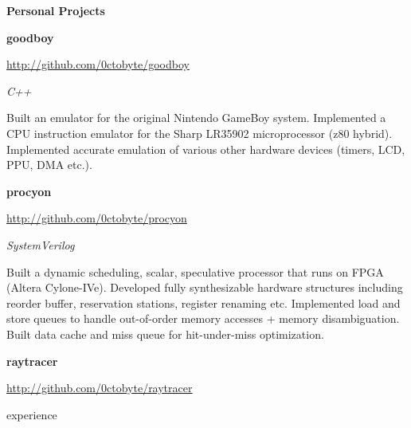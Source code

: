 \documentclass{article}
\newenvironment{name}{\fontfamily{phv}\selectfont\bfseries\normalsize}{\par}
\newenvironment{colorheading}{\fontfamily{phv}\selectfont\bfseries\normalsize\color{darkcyan}}{\par}
\newenvironment{genericbody}{\fontfamily{phv}\selectfont\small\raggedright}{\par}
\newenvironment{metadata}{\fontfamily{phv}\selectfont\itshape\small\color{darkgray}}{\par}
\newenvironment{experience}[2]%
{%
	\begin{minipage}{0.6\linewidth}\begin{flushleft}#1\end{flushleft}\end{minipage}%
	\hfill%
	\begin{minipage}{0.3\linewidth}\begin{flushright}#2\end{flushright}\end{minipage}%
}%
{}
\newcommand{\lineitem}{\item[{$\to$}]}
\newcommand{\dotsep}{\begin{centering}\begin{colorheading}{$\bullet$}\end{colorheading}\end{centering}}
\begin{document}
\begin{minipage}[t]{0.6\linewidth}
		\smallskip
		\dotsep
		\smallskip
		\begin{name}Personal Projects\end{name}
		\smallskip
		\begin{experience}
		{
			\begin{colorheading}goodboy\end{colorheading}
			\begin{genericbody}\url{http://github.com/0ctobyte/goodboy}\end{genericbody}
		}
    {
      \begin{metadata}C++\end{metadata}
    }
		\end{experience}
    \begin{genericbody}
			Built an emulator for the original Nintendo GameBoy system. Implemented a CPU instruction emulator for the Sharp
			LR35902 microprocessor (z80 hybrid). Implemented accurate emulation of various other hardware devices (timers,
			LCD, PPU, DMA etc.).
    \end{genericbody}
		\medskip
		\begin{experience}
		{
			\begin{colorheading}procyon\end{colorheading}
			\begin{genericbody}\url{http://github.com/0ctobyte/procyon}\end{genericbody}
		}
    {
      \begin{metadata}SystemVerilog\end{metadata}
    }
		\end{experience}
    \begin{genericbody}
			Built a dynamic scheduling, scalar, speculative processor that runs on FPGA (Altera Cylone-IVe). Developed fully
			synthesizable hardware structures including reorder buffer, reservation stations, register renaming etc.
			Implemented load and store queues to handle out-of-order memory accesses + memory disambiguation. Built data
			cache and miss queue for hit-under-miss optimization.
    \end{genericbody}
		\medskip
		\begin{experience}
		{
			\begin{colorheading}raytracer\end{colorheading}
			\begin{genericbody}\url{http://github.com/0ctobyte/raytracer}\end{genericbody}
}
\end{experience}
\end{minipage}
\end{document}
